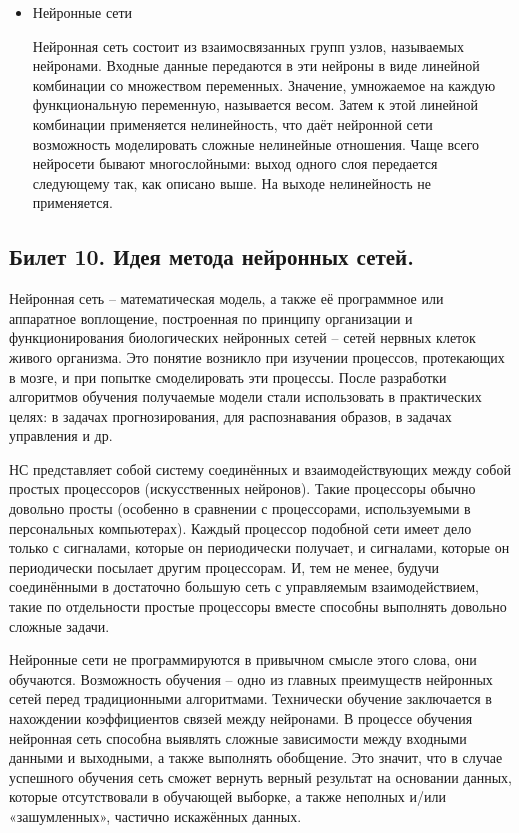 \documentclass[a4paper, 12pt]{article}
\begin{document}
\begin{itemize}
	\item Нейронные сети
	
	Нейронная сеть состоит из взаимосвязанных групп узлов, называемых нейронами. Входные данные передаются в эти нейроны в виде линейной комбинации со множеством переменных. Значение, умножаемое на каждую функциональную переменную, называется весом. Затем к этой линейной комбинации применяется нелинейность, что даёт нейронной сети возможность моделировать сложные нелинейные отношения. Чаще всего нейросети бывают многослойными: выход одного слоя передается следующему так, как описано выше. На выходе нелинейность не применяется.
	\end{itemize}

	\subsection*{Билет 10. Идея метода нейронных сетей.}
	Нейронная сеть -- математическая модель, а также её программное или аппаратное воплощение, построенная по принципу организации и функционирования биологических нейронных сетей -- сетей нервных клеток живого организма. Это понятие возникло при изучении процессов, протекающих в мозге, и при попытке смоделировать эти процессы. После разработки алгоритмов обучения получаемые модели стали использовать в практических целях: в задачах прогнозирования, для распознавания образов, в задачах управления и др.
	
	НС представляет собой систему соединённых и взаимодействующих между собой простых процессоров (искусственных нейронов). Такие процессоры обычно довольно просты (особенно в сравнении с процессорами, используемыми в персональных компьютерах). Каждый процессор подобной сети имеет дело только с сигналами, которые он периодически получает, и сигналами, которые он периодически посылает другим процессорам. И, тем не менее, будучи соединёнными в достаточно большую сеть с управляемым взаимодействием, такие по отдельности простые процессоры вместе способны выполнять довольно сложные задачи.
	
	Нейронные сети не программируются в привычном смысле этого слова, они обучаются. Возможность обучения -- одно из главных преимуществ нейронных сетей перед традиционными алгоритмами. Технически обучение заключается в нахождении коэффициентов связей между нейронами. В процессе обучения нейронная сеть способна выявлять сложные зависимости между входными данными и выходными, а также выполнять обобщение. Это значит, что в случае успешного обучения сеть сможет вернуть верный результат на основании данных, которые отсутствовали в обучающей выборке, а также неполных и/или «зашумленных», частично искажённых данных.
	
\end{document}
